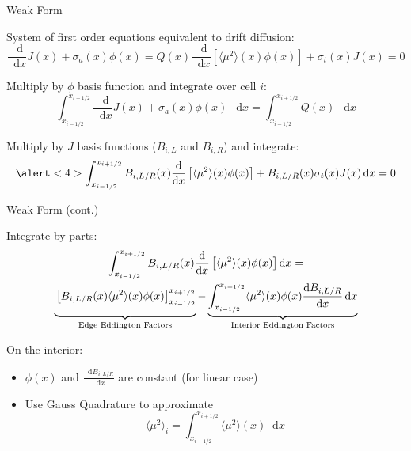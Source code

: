 \documentclass[10pt]{beamer}
\newcommand{\ud}{\mathop{}\!\mathrm{d}} %
\newcommand{\dderiv}[2]{\frac{\ud #1}{\ud #2}}
\newcommand{\edd}{\langle \mu^2 \rangle}
\newcommand{\bracket}[1]{\left[ #1 \right]}
\begin{document}
\begin{frame}{Weak Form}

	System of first order equations equivalent to drift diffusion:
	\begin{subequations} 
	\begin{equation*} \label{eq:zero}
		\dderiv{}{x} J (x) + \sigma_a(x) \phi(x) = Q(x)
	\end{equation*} 
	\begin{equation*} \label{eq:first}
		\dderiv{}{x} \bracket{\edd(x) \phi (x)} + \sigma_t(x) J(x) = 0
	\end{equation*}
	\end{subequations}

	\pause
	Multiply by $\phi$ basis function and integrate over cell $i$: 
	\begin{equation*}
		\int_{x_{i-1/2}}^{x_{i+1/2}} \dderiv{}{x} J (x) + \sigma_a(x) \phi(x) \ \ud x 
		= \int_{x_{i-1/2}}^{x_{i+1/2}} Q(x) \ \ud x
	\end{equation*}

	\pause
	Multiply by $J$ basis functions ($B_{i,L}$ and $B_{i,R}$) and integrate: 
	\begin{equation*}
		\alert<4>{\int_{x_{i-1/2}}^{x_{i+1/2}} 
			B_{i,L/R}(x)\dderiv{}{x} \bracket{\edd(x) \phi (x)}} + B_{i,L/R}(x)\sigma_t(x) J(x) \ud x = 0
	\end{equation*}

\end{frame}

\begin{frame}{Weak Form (cont.)}

	Integrate by parts:
	\begin{multline*}
		\int_{x_{i-1/2}}^{x_{i+1/2}} 
			B_{i,L/R}(x)\dderiv{}{x} \bracket{\edd(x) \phi (x)} \ud x = \\ 
		\underbrace{\vphantom{\int_{x_{i-1/2}}}
		\bracket{B_{i,L/R}(x)\edd(x)\phi(x)}_{x_{i-1/2}}^{x_{i+1/2}}}_\text{Edge Eddington Factors}
		- 
		\underbrace{\int_{x_{i-1/2}}^{x_{i+1/2}}
		\edd(x) \phi(x) \dderiv{B_{i,L/R}}{x} \ud x}_\text{Interior Eddington Factors}
	\end{multline*}

	\pause
	On the interior: 
	\begin{itemize}

		\item $\phi(x)$ and $\dderiv{B_{i,L/R}}{x}$ are constant (for linear case)

		\item Use Gauss Quadrature to approximate 
		\begin{equation*}
			\edd_i = \int_{x_{i-1/2}}^{x_{i+1/2}} \edd(x) \ud x 
		\end{equation*}

	\end{itemize}

\end{frame}
\end{document}
